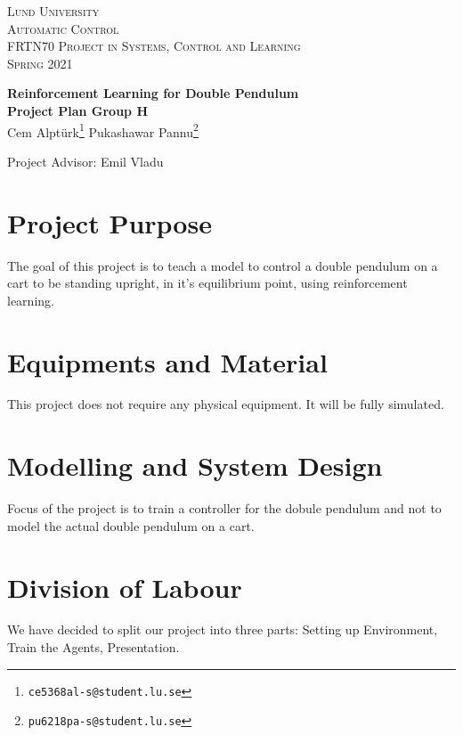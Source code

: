 \documentclass{article}
\begin{document}
\begin{titlepage}
  \begin{flushleft}\scshape
    Lund University\\
    Automatic Control\\[\smallskipamount]
    FRTN70 Project in Systems, Control and Learning\\
    Spring 2021
  \end{flushleft}
  \vspace*{0pt plus 0.3fill}
  \begin{center}
    \huge \textbf{Reinforcement Learning for Double Pendulum}\\[4mm]     
    \large\textbf{Project Plan Group H}\\[5mm]
         Cem Alptürk\footnote{\texttt{ce5368al-s@student.lu.se}}\quad
         Pukashawar Pannu\footnote{\texttt{pu6218pa-s@student.lu.se}}
  \end{center}
\begin{center}
    Project Advisor: Emil Vladu
\end{center}
\vfill
\end{titlepage}        

\section{Project Purpose}
The goal of this project is to teach a model to control a double pendulum on a cart to be standing upright, in it's equilibrium point, using reinforcement learning.

\section{Equipments and Material} \label{sec:equipment}
This project does not require any physical equipment.
It will be fully simulated.

\section{Modelling and System Design}
Focus of the project is to train a controller for the dobule pendulum and not to model the actual double pendulum on a cart.


\section{Division of Labour} \label{sec:division}
We have decided to split our project into three parts: Setting up Environment, Train the Agents, Presentation. 
\end{document}
